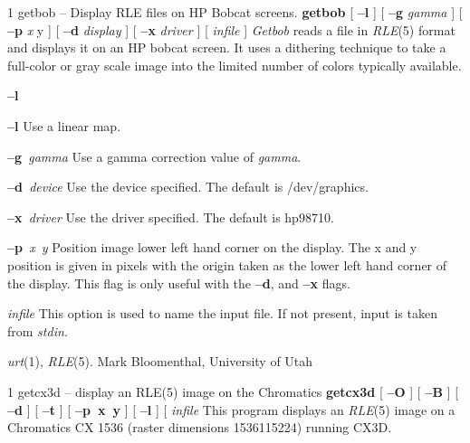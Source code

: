 %
%
%
 1
getbob -- Display RLE files on HP Bobcat screens.
{\bf getbob}
[
{\bf --l}
] [
{\bf --g}
{\it gamma}
] [
{\bf --p}
{\it x} y
] [
{\bf --d}
{\it display}
] [
{\bf --x}
{\it driver}
] [
{\it infile}
]
{\it Getbob}
reads a file in
{\it RLE}{\rm (5)}
format and displays it on an HP bobcat screen.
It uses a dithering technique to take a
full-color or gray scale image into the limited number of colors
typically available.
\begin{TPlist}{{\bf --l}}
\item[{{\bf --l}}]
Use a linear map.
\item[{{\bf --g}{\it \ gamma}
}]
Use a gamma correction value of 
{\it gamma}{\rm .}
\item[{{\bf --d}{\it \ device}
}]
Use the device specified.  The default is /dev/graphics.
\item[{{\bf --x}{\it \ driver}
}]
Use the driver specified.  The default is hp98710.
\item[{{\bf --p}{\it \ x\ y}
}]
Position image lower left hand corner on the display.  The
x and y position is given in pixels with the origin taken as
the lower left hand corner of the display.  This flag is only
useful with the
{\bf --d}{\rm ,}
and
{\bf --x}
flags.
\item[{{\it infile}}]
This option is used to name the input file.  If not present, input is taken
from
{\it stdin.}
\end{TPlist}
{\it urt}{\rm (1),}
{\it RLE}{\rm (5).}
Mark Bloomenthal, University of Utah
\newpage


%
%
%
 1
getcx3d -- display an RLE(5) image on the Chromatics
{\bf getcx3d}
[
{\bf --O}
] [
{\bf --B}
] [
{\bf --d}
] [
{\bf --t}
] [
{\bf --p\ x\ y}
] [
{\bf --l}
] [ 
{\it infile}
This program displays an
{\it RLE}{\rm (5)}
image on a Chromatics CX 1536 (raster dimensions 1536115224)
running CX3D.

